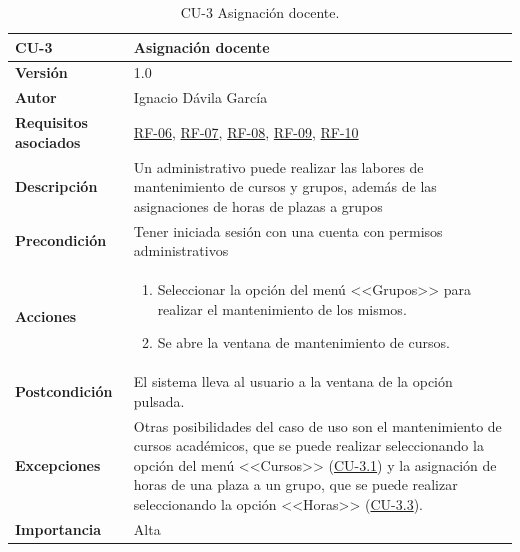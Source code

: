 \begin{table}[p]
	\centering
	\begin{tabularx}{\linewidth}{ p{} p{} }
		\toprule
		\textbf{CU-3}    & \textbf{Asignación docente}\\
		\toprule
		\textbf{Versión}              & 1.0    \\
		\textbf{Autor}                & Ignacio Dávila García \\
		\textbf{Requisitos asociados} & \hyperref[itm:RF6]{RF-06}, \hyperref[itm:RF7]{RF-07}, \hyperref[itm:RF8]{RF-08}, \hyperref[itm:RF9]{RF-09}, \hyperref[itm:RF10]{RF-10} \\
		\textbf{Descripción}          & Un administrativo puede realizar las labores de mantenimiento de cursos y grupos, además de las asignaciones de horas de plazas a grupos \\
		\textbf{Precondición}         & Tener iniciada sesión con una cuenta con permisos administrativos \\
		\textbf{Acciones}             &
		\begin{enumerate}
			\def\labelenumi{\arabic{enumi}.}
			\tightlist
			\item Seleccionar la opción del menú <<Grupos>> para realizar el mantenimiento de los mismos.
			\item Se abre la ventana de mantenimiento de cursos.
		\end{enumerate}\\
		\textbf{Postcondición}        & El sistema lleva al usuario a la ventana de la opción pulsada. \\
		\textbf{Excepciones}          & Otras posibilidades del caso de uso son el mantenimiento de cursos académicos, que se puede realizar seleccionando la opción del menú <<Cursos>> (\hyperref[table:CU-3.1]{CU-3.1}) y la asignación de horas de una plaza a un grupo, que se puede realizar seleccionando la opción <<Horas>> (\hyperref[table:CU-3.3]{CU-3.3}). \\
		\textbf{Importancia}          & Alta \\
		\bottomrule
	\end{tabularx}
	\caption{CU-3 Asignación docente.}
\end{table}
\FloatBarrier


